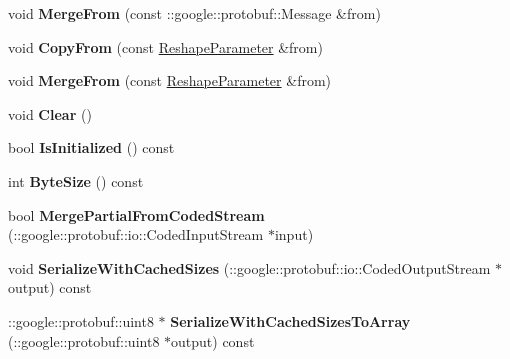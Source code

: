 \begin{DoxyCompactItemize}
void {\bfseries Merge\+From} (const \+::google\+::protobuf\+::\+Message \&from)
\item 
\mbox{\label{classcaffe_1_1_reshape_parameter_a0c2af98fd7e7f4dac9ca7c57fa4a6c88}} 
void {\bfseries Copy\+From} (const \mbox{\hyperlink{classcaffe_1_1_reshape_parameter}{Reshape\+Parameter}} \&from)
\item 
\mbox{\label{classcaffe_1_1_reshape_parameter_a6e84c9ded639460355f6c0ebedca08dd}} 
void {\bfseries Merge\+From} (const \mbox{\hyperlink{classcaffe_1_1_reshape_parameter}{Reshape\+Parameter}} \&from)
\item 
\mbox{\label{classcaffe_1_1_reshape_parameter_aae214010c2d64909f4b7b8d9f0fce9f3}} 
void {\bfseries Clear} ()
\item 
\mbox{\label{classcaffe_1_1_reshape_parameter_a67faa3df02bb711899964dba2e93a6c3}} 
bool {\bfseries Is\+Initialized} () const
\item 
\mbox{\label{classcaffe_1_1_reshape_parameter_a2b7471568856e49dbaee951adaaefabd}} 
int {\bfseries Byte\+Size} () const
\item 
\mbox{\label{classcaffe_1_1_reshape_parameter_aaa2e61919f0897125dfc8c995bac551b}} 
bool {\bfseries Merge\+Partial\+From\+Coded\+Stream} (\+::google\+::protobuf\+::io\+::\+Coded\+Input\+Stream $\ast$input)
\item 
\mbox{\label{classcaffe_1_1_reshape_parameter_a652f11b7be649539bf741c815a4f4234}} 
void {\bfseries Serialize\+With\+Cached\+Sizes} (\+::google\+::protobuf\+::io\+::\+Coded\+Output\+Stream $\ast$output) const
\item 
\mbox{\label{classcaffe_1_1_reshape_parameter_a62c61cf5644f4a19cb0fb822d6687a5c}} 
\+::google\+::protobuf\+::uint8 $\ast$ {\bfseries Serialize\+With\+Cached\+Sizes\+To\+Array} (\+::google\+::protobuf\+::uint8 $\ast$output) const
\item 
\mbox{\label{classcaffe_1_1_reshape_parameter_a2a60a9b08b8aabc382f458026931b8cd}} 

\end{DoxyCompactItemize}

